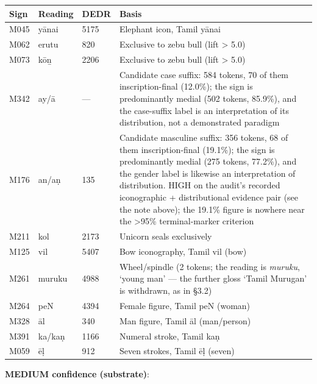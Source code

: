 \documentclass[11pt]{article}
\newcounter{none} %
\begin{document}
{\def\LTcaptype{none} %
\begin{longtable}[]{@{}lll>{\raggedright\arraybackslash}p{}@{}}
\toprule\noalign{}
Sign & Reading & DEDR & Basis \\
\midrule\noalign{}
\endhead
\bottomrule\noalign{}
\endlastfoot
M045 & yānai & 5175 & Elephant icon, Tamil yānai \\
M062 & erutu & 820 & Exclusive to zebu bull (lift \textgreater{} 5.0) \\
M073 & kōṉ & 2206 & Exclusive to zebu bull (lift \textgreater{} 5.0) \\
M342 & ay/ā & --- & Candidate case suffix: 584 tokens, 70 of them inscription-final (12.0\%); the sign is predominantly medial (502 tokens, 85.9\%), and the case-suffix label is an interpretation of its distribution, not a demonstrated paradigm \\
M176 & an/aṇ & 135 & Candidate masculine suffix: 356 tokens, 68 of them inscription-final (19.1\%); the sign is predominantly medial (275 tokens, 77.2\%), and the gender label is likewise an interpretation of distribution. HIGH on the audit's recorded iconographic + distributional evidence pair (see the note above); the 19.1\% figure is nowhere near the \textgreater95\% terminal-marker criterion \\
M211 & kol & 2173 & Unicorn seals exclusively \\
M125 & vil & 5407 & Bow iconography, Tamil vil (bow) \\
M261 & muruku & 4988 & Wheel/spindle (2 tokens; the reading is \emph{muruku}, `young man' --- the further gloss `Tamil Murugan' is withdrawn, as in §3.2) \\
M264 & peN & 4394 & Female figure, Tamil peN (woman) \\
M328 & āl & 340 & Man figure, Tamil āl (man/person) \\
M391 & ka/kaṇ & 1166 & Numeral stroke, Tamil kaṇ \\
M059 & ēḷ & 912 & Seven strokes, Tamil ēḷ (seven) \\
\end{longtable}
}

\textbf{MEDIUM confidence (substrate)}:
\end{document}
